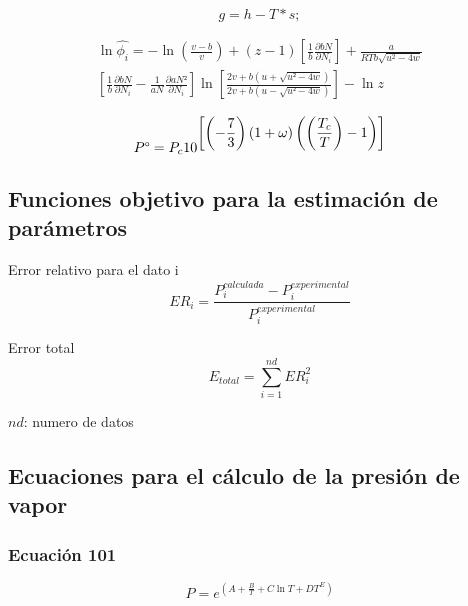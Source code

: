 \begin{equation}\label{eq:gibbs}
g = h - T * s;
\end{equation}


\begin{multline}\label{eq:fugacity}
\ln\hat{\phi_i} = - \ln\left(\frac{v-b}{v}\right) 
+ (z-1)\left[\frac{1}{b}\frac{\partial bN}{\partial N_i}\right]
+ \frac{a}{RTb\sqrt{u^2-4w}}
\\
\left[\frac{1}{b}\frac{\partial bN}{\partial N_i}
- \frac{1}{aN}\frac{\partial aN²}{\partial N_i}\right]
\ln\left[\frac{2v+b\left(u + \sqrt{u²-4w}\right)}{2v+b\left(u - \sqrt{u²-4w}\right)}\right]
-\ln{z}
\end{multline}




\begin{equation}\label{eq:pressureacentricfactor}
 P\degree= P_c 10^{\displaystyle\left[\left(-\frac{7}{3}\right) \left(1+\omega \right)  \left(\left(\frac{T_c}{T}\right) - 1 \right) \right]}
\end{equation}


\subsection{Funciones objetivo para la estimación de parámetros}
Error relativo para el dato i
\begin{equation}\label{eq:relativeerror}
ER_i=\frac{P_i^{calculada} - P_i^{experimental}}{P_i^{experimental}}
\end{equation}

Error total
\begin{equation}\label{eq:totalerror}
	E_{total} = \sum_{i=1}^{nd} ER_i^2
\end{equation}

$nd$: numero de datos



\subsection{Ecuaciones para el cálculo de la presión de vapor}

\subsubsection{Ecuación 101}
\begin{equation}\label{eq:101vaporpressure}
	P =e^{\displaystyle\left(A +\frac{B}{T}+C\ln{T}+D {T^E}\right)}
\end{equation}